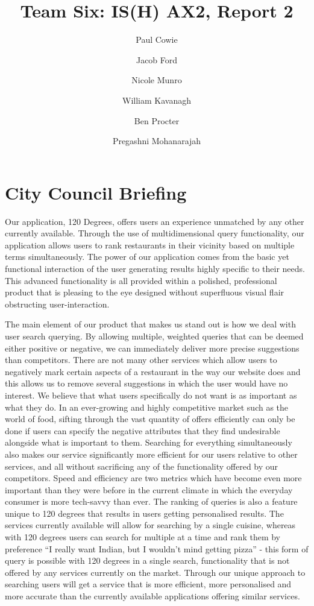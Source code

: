 \documentclass[10pt,a4paper]{article}
\author{Paul Cowie \and Jacob Ford \and Nicole Munro \and William Kavanagh \and Ben Procter \and Pregashni Mohanarajah }
\date{}
\title{Team Six: IS(H) AX2, Report 2}
\begin{document}
\maketitle

\section*{City Council Briefing}

Our application, 120 Degrees, offers users an experience unmatched by any other currently available. Through the use of multidimensional query functionality, our application allows users to rank restaurants in their vicinity based on multiple terms simultaneously. The power of our application comes from the basic yet functional interaction of the user generating results highly specific to their needs. This advanced functionality is all provided within a polished, professional product that is pleasing to the eye designed without superfluous visual flair obstructing user-interaction.

The main element of our product that makes us stand out is how we deal with user search querying. By allowing multiple, weighted queries that can be deemed either positive or negative, we can immediately deliver more precise suggestions than competitors. There are not many other services which allow users to negatively mark certain aspects of a restaurant in the way our website does and this allows us to remove several suggestions in which the user would have no interest. We believe that what users specifically do not want is as important as what they do. In an ever-growing and highly competitive market such as the world of food, sifting through the vast quantity of offers efficiently can only be done if users can specify the negative attributes that they find undesirable alongside what is important to them. Searching for everything simultaneously also makes our service significantly more efficient for our users relative to other services, and all without sacrificing any of the functionality offered by our competitors. Speed and efficiency are two metrics which have become even more important than they were before in the current climate in which the everyday consumer is more tech-savvy than ever. The ranking of queries is also a feature unique to 120 degrees that results in users getting personalised results. The services currently available will allow for searching by a single cuisine, whereas with 120 degrees users can search for multiple at a time and rank them by preference “I really want Indian, but I wouldn’t mind getting pizza” - this form of query is possible with 120 degrees in a single search, functionality that is not offered by any services currently on the market. Through our unique approach to searching users will get a service that is more efficient, more personalised and more accurate than the currently available applications offering similar services.
\end{document}
